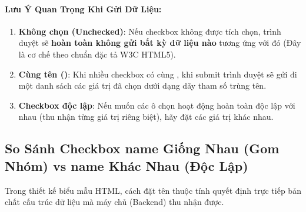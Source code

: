 \paragraph{Lưu Ý Quan Trọng Khi Gửi Dữ Liệu:}
\begin{enumerate}[leftmargin=1.5em, itemsep=2pt, parsep=0pt]
    \item \textbf{Không chọn (Unchecked)}: Nếu checkbox không được tích chọn, trình duyệt sẽ \textbf{hoàn toàn không gửi bất kỳ dữ liệu nào} tương ứng với  đó (Đây là cơ chế  theo chuẩn đặc tả W3C HTML5).
    \item \textbf{Cùng tên ()}: Khi nhiều checkbox có cùng , khi submit trình duyệt sẽ gửi đi một danh sách các giá trị đã chọn dưới dạng dãy tham số trùng tên.
    \item \textbf{Checkbox độc lập}: Nếu muốn các ô chọn hoạt động hoàn toàn độc lập với nhau (thu nhận từng giá trị riêng biệt), hãy đặt các giá trị  khác nhau.
\end{enumerate}

\subsection{So Sánh Checkbox name Giống Nhau (Gom Nhóm) vs name Khác Nhau (Độc Lập)}

Trong thiết kế biểu mẫu HTML, cách đặt tên thuộc tính  quyết định trực tiếp bản chất cấu trúc dữ liệu mà máy chủ (Backend) thu nhận được.

